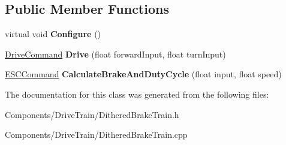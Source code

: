 \subsection*{\-Public \-Member \-Functions}
\begin{DoxyCompactItemize}
\item 
\hypertarget{class_dithered_brake_train_a84de34851821ba3a11c01bcb4670273d}{
virtual void {\bfseries \-Configure} ()}
\label{class_dithered_brake_train_a84de34851821ba3a11c01bcb4670273d}

\item 
\hypertarget{class_dithered_brake_train_a4a67b208158acac7c5771ca8bc2e06a2}{
\hyperlink{struct_drive_command}{\-Drive\-Command} {\bfseries \-Drive} (float forward\-Input, float turn\-Input)}
\label{class_dithered_brake_train_a4a67b208158acac7c5771ca8bc2e06a2}

\item 
\hypertarget{class_dithered_brake_train_a90b5316ec6404a12b695085ab65f20ef}{
\hyperlink{struct_e_s_c_command}{\-E\-S\-C\-Command} {\bfseries \-Calculate\-Brake\-And\-Duty\-Cycle} (float input, float speed)}
\label{class_dithered_brake_train_a90b5316ec6404a12b695085ab65f20ef}

\end{DoxyCompactItemize}


\-The documentation for this class was generated from the following files\-:\begin{DoxyCompactItemize}
\item 
\-Components/\-Drive\-Train/\-Dithered\-Brake\-Train.\-h\item 
\-Components/\-Drive\-Train/\-Dithered\-Brake\-Train.\-cpp\end{DoxyCompactItemize}
